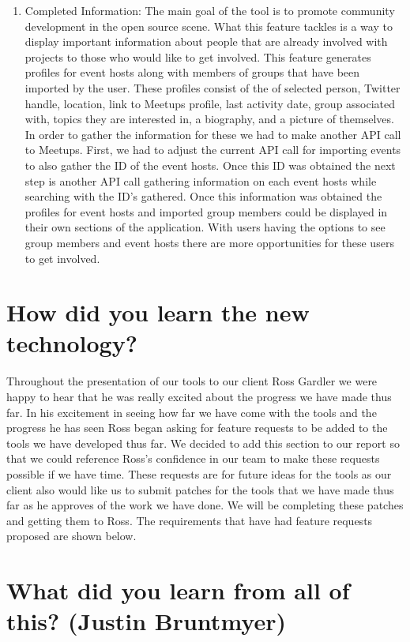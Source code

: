 \documentclass[draftclsnofoot,10pt,onecolumn]{IEEEtran} %
\begin{document}
\begin{enumerate}
\begin{enumerate}
  \item Completed Information: The main goal of the tool is to promote community
    development in the open source scene. What this feature tackles is a way to display
    important information about people that are already involved with projects to those
    who would like to get involved. This feature generates profiles for event hosts along
    with members of groups that have been imported by the user. These profiles consist of 
    the of selected person, Twitter handle, location, link to Meetups profile, last activity date, 
    group associated with, topics they are interested in, a biography, and a picture of themselves.
    In order to gather the information for these we had to make another API call to Meetups. First,
    we had to adjust the current API call for importing events to also gather the ID of the event hosts.
    Once this ID was obtained the next step is another API call gathering information on each event hosts
    while searching with the ID's gathered. Once this information was obtained the profiles for event
    hosts and imported group members could be displayed in their own sections of the application.
    With users having the options to see group members and event hosts there are more opportunities
    for these users to get involved.

\end{enumerate}


\section{How did you learn the new technology?}
Throughout the presentation of our tools to our client Ross Gardler we were happy to hear that he was really excited about the progress we have made thus far.
In his excitement in seeing how far we have come with the tools and the progress he has seen
Ross began asking for feature requests to be added to the tools we have developed thus far.
We decided to add this section to our report so that we could reference Ross's confidence in our team to make these requests possible if we have time.
These requests are for future ideas for the tools as our client also would like us to submit patches for the tools
that we have made thus far as he approves of the work we have done. We will be completing these patches and getting them to Ross.
The requirements that have had feature requests proposed are shown below.

\section{What did you learn from all of this? (Justin Bruntmyer)}


\end{enumerate}
\end{document}
